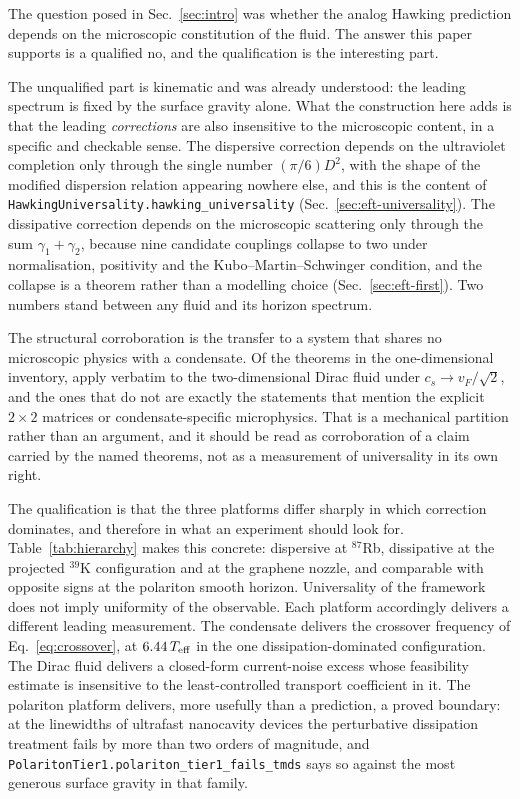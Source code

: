 \documentclass[aps,prd,reprint,nofootinbib,superscriptaddress]{revtex4-2}
\begin{document}
The question posed in Sec.~\ref{sec:intro} was whether the analog Hawking
prediction depends on the microscopic constitution of the fluid. The
answer this paper supports is a qualified no, and the qualification is
the interesting part.

The unqualified part is kinematic and was already understood: the
leading spectrum is fixed by the surface gravity alone. What the
construction here adds is that the leading \emph{corrections} are also
insensitive to the microscopic content, in a specific and checkable
sense. The dispersive correction depends on the ultraviolet completion
only through the single number $(\pi/6)D^2$, with the shape of the
modified dispersion relation appearing nowhere else, and this is the
content of \texttt{HawkingUniversality.hawking\_universality}
(Sec.~\ref{sec:eft-universality}). The dissipative correction depends on
the microscopic scattering only through the sum $\gamma_1 + \gamma_2$,
because nine candidate couplings collapse to two under normalisation,
positivity and the Kubo--Martin--Schwinger condition, and the collapse is
a theorem rather than a modelling choice
(Sec.~\ref{sec:eft-first}). Two numbers stand between any fluid and its
horizon spectrum.

The structural corroboration is the transfer to a system that shares no
microscopic physics with a condensate. Of the
\reusePopulation{} theorems in the one-dimensional inventory,
\reuseTransferred{} apply verbatim to the two-dimensional Dirac fluid
under $c_s \to v_F/\sqrt{2}$, and the ones that do not are exactly the
statements that mention the explicit $2\times2$ matrices or
condensate-specific microphysics. That is a mechanical partition rather
than an argument, and it should be read as corroboration of a claim
carried by the named theorems, not as a measurement of universality in
its own right.

The qualification is that the three platforms differ sharply in which
correction dominates, and therefore in what an experiment should look
for. Table~\ref{tab:hierarchy} makes this concrete: dispersive at
$^{87}$Rb, dissipative at the projected $^{39}$K configuration and at the
graphene nozzle, and comparable with opposite signs at the polariton
smooth horizon. Universality of the framework does not imply uniformity
of the observable. Each platform accordingly delivers a different
leading measurement. The condensate delivers the crossover frequency of
Eq.~\eqref{eq:crossover}, at $6.44\,T_{\rm eff}$ in the one
dissipation-dominated configuration. The Dirac fluid delivers a
closed-form current-noise excess whose feasibility estimate is
insensitive to the least-controlled transport coefficient in it. The
polariton platform delivers, more usefully than a prediction, a proved
boundary: at the linewidths of ultrafast nanocavity devices the
perturbative dissipation treatment fails by more than two orders of
magnitude, and \texttt{PolaritonTier1.polariton\_tier1\_fails\_tmds}
says so against the most generous surface gravity in that family.
\end{document}
